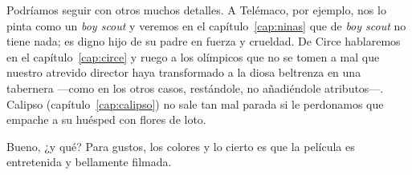 
Podríamos seguir con otros muchos detalles. A Telémaco, por ejemplo, nos lo pinta como un \emph{boy scout} y veremos en el capítulo~\ref{cap:ninas} que de \emph{boy scout} no tiene nada; es digno hijo de su padre en fuerza y crueldad. De Circe hablaremos en el capítulo~\ref{cap:circe} y ruego a los olímpicos que no se tomen a mal que nuestro atrevido director haya transformado a la diosa beltrenza en una tabernera ---como en los otros casos, restándole, no añadiéndole atributos---. Calipso (capítulo~\ref{cap:calipso}) no sale tan mal parada si le perdonamos que empache a su huésped con flores de loto.

Bueno, ¿y qué? Para gustos, los colores y lo cierto es que la película es entretenida y bellamente filmada.


